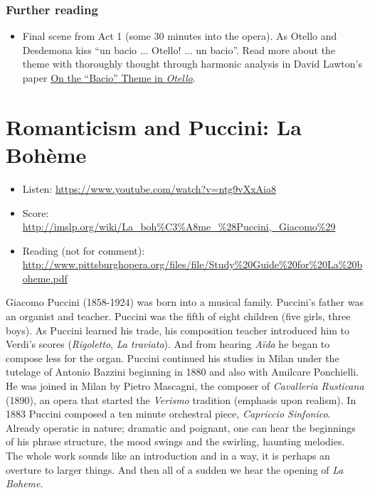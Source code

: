 \subsubsection{Further reading}
\begin{itemize}
\item Final scene from Act 1 (some 30 minutes into the opera). As Otello and Desdemona kiss ``un bacio ... Otello! ... un bacio''. Read more about the theme with thoroughly thought through harmonic analysis in David Lawton's paper \href{http://www.jstor.org/stable/746411?seq=1#page_scan_tab_contents}{On the ``Bacio'' Theme in \textit{Otello}}. 
\end{itemize}

\section{Romanticism and Puccini: La Boh\`eme}
\begin{itemize}
\item Listen: \url{https://www.youtube.com/watch?v=ntg9vXxAia8}
\item Score: \url{http://imslp.org/wiki/La_boh%C3%A8me_%28Puccini,_Giacomo%29}
\item Reading (not for comment): \url{http://www.pittsburghopera.org/files/file/Study%20Guide%20for%20La%20boheme.pdf}
\end{itemize}

Giacomo Puccini (1858-1924) was born into a musical family. Puccini's father was an organist and teacher. 
Puccini was the fifth of eight children (five girls, three boys). As Puccini learned his trade, his 
composition teacher introduced him to Verdi's scores (\textit{Rigoletto}, \textit{La traviata}). And from 
hearing \textit{A\"ida} he began to compose less for the organ. Puccini continued his studies in Milan under 
the tutelage of Antonio Bazzini beginning in 1880 and also with Amilcare Ponchielli. He was joined in Milan 
by Pietro Mascagni, the composer of \textit{Cavalleria Rusticana} (1890), an opera that started the \textit
{Verismo} tradition (emphasis upon realism). In 1883 Puccini composed a ten minute orchestral piece, \textit
{Capriccio Sinfonico}. Already operatic in nature; dramatic and poignant, one  can hear the beginnings of his 
phrase structure, the mood swings and the swirling, haunting melodies. The whole work sounds like an 
introduction and in a way, it is perhaps an overture to larger things. And then all of a sudden we hear the 
opening of \textit{La Boheme}. 


